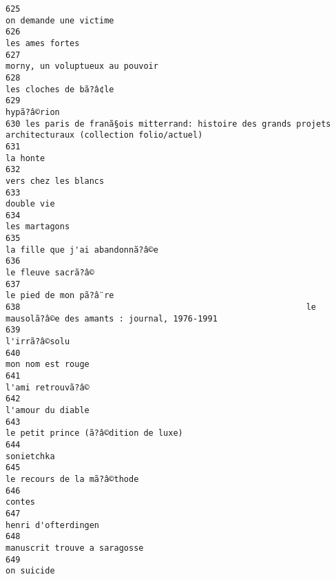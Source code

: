 \documentclass[
]{report}
\begin{document}
\begin{verbatim}
625                                                                                  on demande une victime
626                                                                                         les ames fortes
627                                                                         morny, un voluptueux au pouvoir
628                                                                                  les cloches de bã?â¢le
629                                                                                             hypã?â©rion
630 les paris de franã§ois mitterrand: histoire des grands projets architecturaux (collection folio/actuel)
631                                                                                                la honte
632                                                                                    vers chez les blancs
633                                                                                              double vie
634                                                                                           les martagons
635                                                                         la fille que j'ai abandonnã?â©e
636                                                                                      le fleuve sacrã?â©
637                                                                                  le pied de mon pã?â¨re
638                                                          le mausolã?â©e des amants : journal, 1976-1991
639                                                                                           l'irrã?â©solu
640                                                                                       mon nom est rouge
641                                                                                       l'ami retrouvã?â©
642                                                                                       l'amour du diable
643                                                                    le petit prince (ã?â©dition de luxe)
644                                                                                              sonietchka
645                                                                             le recours de la mã?â©thode
646                                                                                                  contes
647                                                                                     henri d'ofterdingen
648                                                                            manuscrit trouve a saragosse
649                                                                                              on suicide

\end{verbatim}
\end{document}
